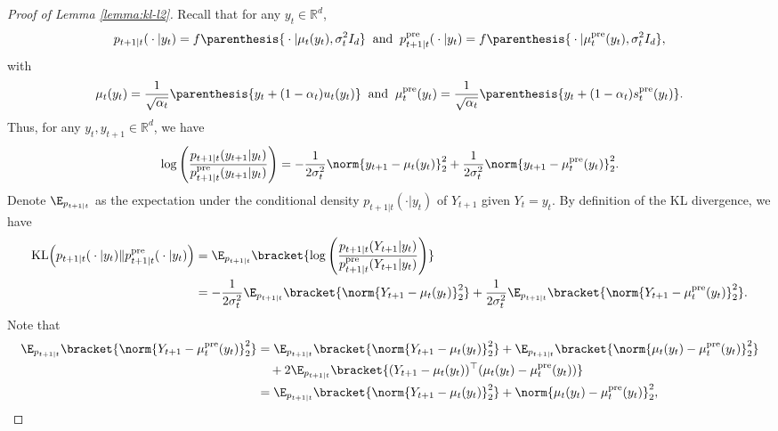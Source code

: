 \documentclass{article}
\newcommand{\R}{\mathbb{R}}
\begin{document}
    \begin{proof}[Proof of Lemma \ref{lemma:kl-l2}]
        Recall that for any $y_t \in \R^d$,
        \begin{align*}
           {p_{t+1\vert t}({}\cdot{}\vert y_{t})} = f\parenthesis{{}\cdot{}\vert\mu_t(y_t), \sigma_{t}^{2} I_d} \;\; \text{and}\;\; p_{t+1\vert t}^{\rm pre}({}\cdot{}\vert y_{t}) = f\parenthesis{{}\cdot{}\vert\mu_t^{\rm pre}(y_t), \sigma_{t}^{2} I_d},
        \end{align*}
        with 
        \begin{align*}
            \mu_t(y_t) = \frac{1}{\sqrt{\alpha_t}}\parenthesis{y_t + (1 - \alpha_t)u_t(y_t)} \;\; \text{and} \;\; \mu_t^{\rm pre}(y_t) = \frac{1}{\sqrt{\alpha_t}}\parenthesis{y_t + (1 - \alpha_t)s^{\rm pre}_t(y_t)}.
        \end{align*}
        Thus, for any $y_t, y_{t+1} \in \R^d$, we have
        \begin{align*}
            \log \left(\frac{p_{t+1\vert t}(y_{t+1} \vert y_t)}{p^{\rm pre}_{t+1\vert t}(y_{t+1} \vert y_t)} \right)= -\frac{1}{2\sigma_t^2}\norm{y_{t+1} - \mu_t(y_t)}_2^2 + \frac{1}{2\sigma_t^2}\norm{y_{t+1} - \mu_t^{\rm pre}(y_t)}_2^2. 
        \end{align*}
        Denote $\E_{p_{t+1\vert t}}$ as the expectation under the conditional density $p_{t+1\vert t}(\cdot\vert y_t)$ of $Y_{t+1}$ given $Y_t = y_t$. By definition of the KL divergence, we have %
        \begin{align}
             {\rm KL}\Big(p_{t+1\vert t}({}\cdot{}\vert y_t) \|p_{t+1\vert t}^{\rm pre}({}\cdot{}\vert y_t)\Big) & =\E_{p_{t+1\vert t}}\bracket{\log \left(\frac{p_{t+1\vert t}(Y_{t+1} \vert y_t)}{p^{\rm pre}_{t+1\vert t}(Y_{t+1} \vert y_t)}\right)} \nonumber\\ & = -\frac{1}{2\sigma_t^2}\E_{p_{t+1\vert t}}\bracket{\norm{Y_{t+1} - \mu_t(y_t)}_2^2} +  \frac{1}{2\sigma_t^2}\E_{p_{t+1\vert t}}\bracket{\norm{Y_{t+1} - \mu_t^{\rm pre}(y_t)}_2^2}. \label{eq:kl-simple}
        \end{align}
        Note that 
        \begin{align*}
            \E_{p_{t+1\vert t}}\bracket{\norm{Y_{t+1} - \mu_t^{\rm pre}(y_t)}_2^2} & = \E_{p_{t+1\vert t}}\bracket{\norm{Y_{t+1} - \mu_t(y_t)}_2^2} + \E_{p_{t+1\vert t}}\bracket{\norm{\mu_t(y_t) - \mu_t^{\rm pre}(y_t)}_2^2} \\ & \quad + 2\E_{p_{t+1\vert t}}\bracket{(Y_{t+1} - \mu_t(y_t))^\top(\mu_t(y_t) -\mu_t^{\rm pre}(y_t))} \\ & = \E_{p_{t+1\vert t}}\bracket{\norm{Y_{t+1} - \mu_t(y_t)}_2^2} + \norm{\mu_t(y_t) - \mu_t^{\rm pre}(y_t)}_2^2,

\end{align*}
\end{proof}
\end{document}
